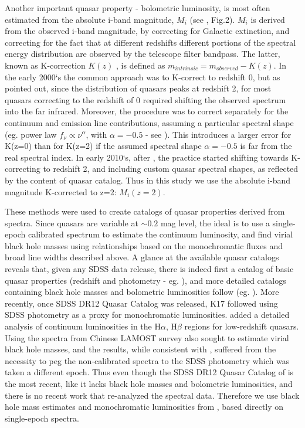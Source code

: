 \documentclass[twocolumn]{aastex62}
\begin{document}
Another important quasar property - bolometric luminosity, is most often estimated from the absolute i-band magnitude, $M_{i}$ (see \citealt{shen2008}, Fig.2). $M_{i}$ is derived from the observed i-band magnitude, by correcting for Galactic extinction, and correcting for the fact that at different redshifts different portions of the spectral energy distribution are observed by the telescope filter bandpass. The latter, known as K-correction $K(z)$ \citep{oke1968},  is defined as $m_{intrinsic} = m_{observed} - K(z)$. In the early 2000`s the common approach was to K-correct to redshift 0, but as \citep{richards2006a} pointed out, since the distribution of quasars peaks at redshift 2, for most quasars correcting to the redshift of 0 required shifting the observed spectrum into the far infrared. Moreover, the procedure was to correct separately for the continuum and emission line contributions, assuming a particular spectral shape (eg. power law  $f_{\nu} \propto \nu^{\alpha}$, with $\alpha=-0.5$ - see \citealt{schneider2010, vandenberk2001, richards2006a}).  This introduces a larger error for K(z=0) than for K(z=2) if the assumed spectral shape $\alpha=-0.5$ is far from the real spectral index. In early 2010`s, after  \citealt{richards2006a, wisotzki2000, blanton2003},  the practice started shifting towards K-correcting to redshift 2,  and including custom quasar spectral shapes, as reflected by the content of \cite{shen2011} quasar catalog. Thus in this study we use  the absolute i-band magnitude K-corrected to z=2: $M_{i}(z=2)$. 



These methods were used to create catalogs of quasar properties derived from spectra. Since quasars are variable at ${\sim}0.2$ mag level, the ideal is to use a single-epoch calibrated spectrum to estimate the continuum luminosity, and find virial black hole masses using relationships based on the monochromatic fluxes and broad line widths described above. A glance at the available quasar catalogs reveals that, given any SDSS data release, there is indeed first a catalog of basic quasar properties (redshift and photometry - eg. \citealt{schneider2007, schneider2010}), and more detailed catalogs containing black hole masses and bolometric luminosities  follow (eg. \citealt{shen2008, shen2011}). More recently, once SDSS DR12 Quasar Catalog \citep{paris2017} was released,  K17 followed using SDSS photometry as a proxy for monochromatic luminosities. \citet{chen2018} added a detailed analysis of continuum luminosities in the  H$\alpha$, H$\beta$ regions for low-redshift quasars. Using the spectra from Chinese LAMOST survey \citet{dong2018} also sought to estimate virial black hole masses, and the results, while consistent with \citet{shen2011}, suffered from the necessity to peg the non-calibrated spectra to the SDSS photometry which was taken  a different epoch. Thus even though the SDSS DR12 Quasar Catalog of \cite{paris2018}  is the most recent, like \citet{paris2017} it lacks black hole masses and bolometric luminosities, and there is no recent work that re-analyzed the spectral data. Therefore we use black hole mass estimates and monochromatic luminosities from \citet{shen2011}, based directly on single-epoch spectra. 
\end{document}
